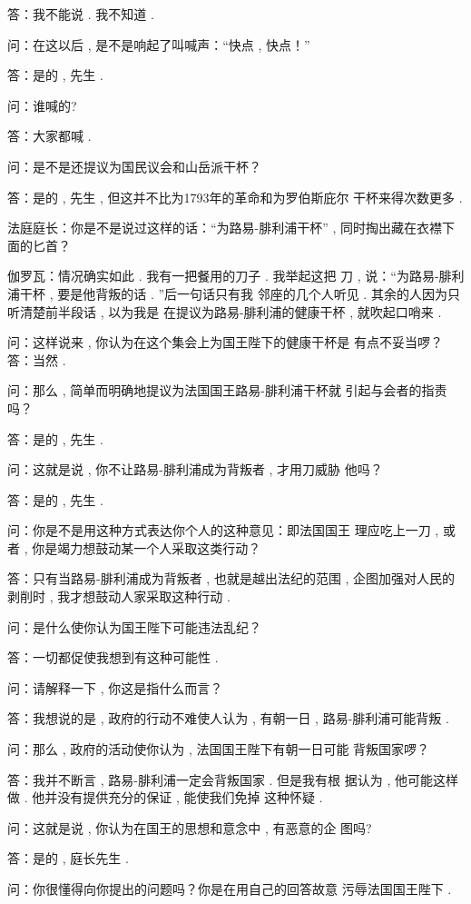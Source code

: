 答：我不能说 . 我不知道 . 

问：在这以后 , 是不是响起了叫喊声：“快点 , 快点！”

答：是的 , 先生 . 

问：谁喊的?

答：大家都喊 . 

问：是不是还提议为国民议会和山岳派干杯？

答：是的 , 先生 , 但这并不比为1793年的革命和为罗伯斯庇尔 干杯来得次数更多 . 

法庭庭长：你是不是说过这样的话：“为路易-腓利浦干杯” , 同时掏出藏在衣襟下面的匕首？

伽罗瓦：情况确实如此 . 我有一把餐用的刀子 . 我举起这把 刀 , 说：“为路易-腓利浦干杯 , 要是他背叛的话 . ”后一句话只有我 邻座的几个人听见 . 其余的人因为只听清楚前半段话 , 以为我是 在提议为路易-腓利浦的健康干杯 , 就吹起口哨来 . 

问：这样说来 , 你认为在这个集会上为国王陛下的健康干杯是 有点不妥当啰？
答：当然 . 

问：那么 , 简单而明确地提议为法国国王路易-腓利浦干杯就 引起与会者的指责吗？

答：是的 , 先生 . 

问：这就是说 , 你不让路易-腓利浦成为背叛者 , 才用刀威胁 他吗？

答：是的 , 先生 . 

问：你是不是用这种方式表达你个人的这种意见：即法国国王 理应吃上一刀 , 或者 , 你是竭力想鼓动某一个人采取这类行动？

答：只有当路易-腓利浦成为背叛者 , 也就是越出法纪的范围 , 企图加强对人民的剥削时 , 我才想鼓动人家采取这种行动 . 

问：是什么使你认为国王陛下可能违法乱纪？

答：一切都促使我想到有这种可能性 . 

问：请解释一下 , 你这是指什么而言？

答：我想说的是 , 政府的行动不难使人认为 , 有朝一日 , 路易-腓利浦可能背叛 . 

问：那么 , 政府的活动使你认为 , 法国国王陛下有朝一日可能 背叛国家啰？

答：我并不断言 , 路易-腓利浦一定会背叛国家 . 但是我有根 据认为 , 他可能这样做 . 他并没有提供充分的保证 , 能使我们免掉 这种怀疑 . 

问：这就是说 , 你认为在国王的思想和意念中 , 有恶意的企 图吗?

答：是的 , 庭长先生 . 

问：你很懂得向你提出的问题吗？你是在用自己的回答故意 污辱法国国王陛下 . 

